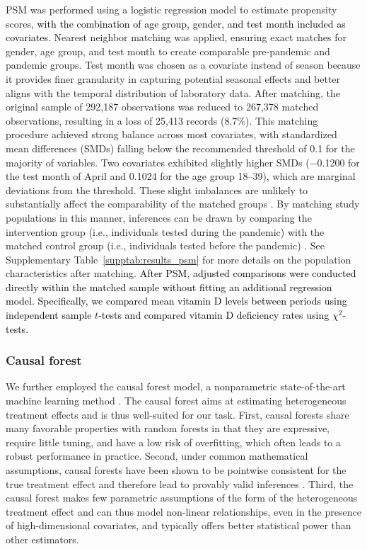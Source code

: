 \documentclass[12pt]{article}
\newcommand{\REV}[1]{\textcolor{black}{#1}}
\begin{document}
PSM \cite{Rosenbaum1983} was performed using a logistic regression model to estimate propensity scores, \REV{with the combination of age group, gender, and test month included as covariates}. Nearest neighbor matching was applied, ensuring exact matches for gender, age group, and test month to create comparable pre-pandemic and pandemic groups. Test month was chosen as a covariate instead of season because it provides finer granularity in capturing potential seasonal effects and better aligns with the temporal distribution of laboratory data. After matching, the original sample of 292,187 observations was reduced to 267,378 matched observations, resulting in a loss of 25,413 records (8.7\%). This matching procedure achieved strong balance across most covariates, with standardized mean differences (SMDs) falling below the recommended threshold of 0.1 for the majority of variables. Two covariates exhibited slightly higher SMDs ($-$0.1200 for the test month of April and 0.1024 for the age group 18--39), which are marginal deviations from the threshold. These slight imbalances are unlikely to substantially affect the comparability of the matched groups \cite{Stuart2010}. By matching study populations in this manner, inferences can be drawn by comparing the intervention group (i.e., individuals tested during the pandemic) with the matched control group (i.e., individuals tested before the pandemic)  \cite{Shah2005}. See Supplementary Table~\ref{supptab:results_psm} for more details on the population characteristics after matching. \REV{After PSM, adjusted comparisons were conducted directly within the matched sample without fitting an additional regression model. Specifically, we compared mean vitamin D levels between periods using independent sample $t$-tests and compared vitamin D deficiency rates using $\chi^2$-tests.}

\subsubsection*{Causal forest}

We further employed the causal forest model, a nonparametric state-of-the-art machine learning method  \cite{Athey2019, Wager2018, Feuerriegel2024}. The causal forest aims at estimating heterogeneous treatment effects and is thus well-suited for our task. First, causal forests share many favorable properties with random forests in that they are expressive, require little tuning, and have a low risk of overfitting, which often leads to a robust performance in practice. Second, under common mathematical assumptions, causal forests have been shown to be pointwise consistent for the true treatment effect and therefore lead to provably valid inferences \cite{Wager2018}. Third, the causal forest makes few parametric assumptions of the form of the heterogeneous treatment effect and can thus model non-linear relationships, even in the presence of high-dimensional covariates, and typically offers better statistical power than other estimators.  
\end{document}
